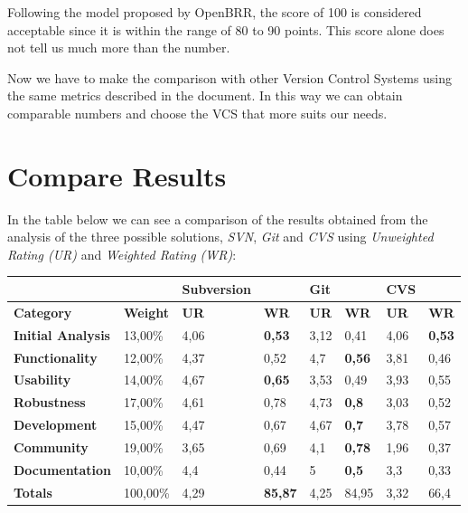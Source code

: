 \documentclass[11pt]{scrartcl}
\begin{document}
\par Following the model proposed by OpenBRR, the score of 100 is considered acceptable since it is within the range of 80 to 90 points. This score alone does not tell us much more than the number.

\par Now we have to make the comparison with other Version Control Systems using the same metrics described in the document. In this way we can obtain comparable numbers and choose the VCS that more suits our needs.

\section{Compare Results}

\par In the table below we can see a comparison of the results obtained from the analysis of the three possible solutions, \emph{SVN}, \emph{Git} and \emph{CVS} using \emph{Unweighted Rating (UR)} and \emph{Weighted Rating (WR)}:

\begin{tabular}{|l|l|l|l|l|l|l|l|}
    \hline
     &  & {\bf Subversion} &   & {\bf Git} &  & {\bf CVS} &  \\
    \hline
    {\bf Category} & {\bf Weight} & {\bf UR} & {\bf WR} & {\bf UR} & {\bf WR} & {\bf UR} & {\bf WR}\\
    \hline
    {\bf Initial Analysis} & 13,00\% & 4,06 & {\bf 0,53} & 3,12 & 0,41 & 4,06 & {\bf 0,53}\\
    \hline
    {\bf Functionality} & 12,00\% & 4,37 & 0,52 & 4,7 & {\bf 0,56} & 3,81 & 0,46\\
    \hline
    {\bf Usability} & 14,00\% & 4,67 & {\bf 0,65} & 3,53 & 0,49 & 3,93 & 0,55\\
    \hline
    {\bf Robustness} & 17,00\% & 4,61 & 0,78 & 4,73 & {\bf 0,8} & 3,03 & 0,52\\
    \hline
    {\bf Development} & 15,00\% & 4,47 & 0,67 & 4,67 & {\bf 0,7} & 3,78 & 0,57\\
    \hline
    {\bf Community} & 19,00\% & 3,65 & 0,69 & 4,1 & {\bf 0,78} & 1,96 & 0,37\\
    \hline
    {\bf Documentation} & 10,00\% & 4,4 & 0,44 & 5 & {\bf 0,5} & 3,3 & 0,33\\
    \hline
    {\bf Totals} & 100,00\% & 4,29 & {\bf 85,87} & 4,25 & 84,95 & 3,32 & 66,4\\
    \hline
\end{tabular}
\end{document}
